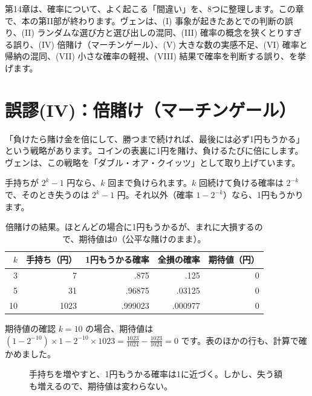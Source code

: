 \documentclass[a4paper,11pt,openany]{ltjsbook}
\begin{document}
第14章は、確率について、よく起こる「間違い」を、8つに整理します。この章で、本の第II部が終わります。ヴェンは、(I) 事象が起きたあとでの判断の誤り、(II) ランダムな選び方と選び出しの混同、(III) 確率の概念を狭くとりすぎる誤り、(IV) 倍賭け（マーチンゲール）、(V) 大きな数の実感不足、(VI) 確率と帰納の混同、(VII) 小さな確率の軽視、(VIII) 結果で確率を判断する誤り、を挙げます。

\section{誤謬(IV)：倍賭け（マーチンゲール）}

「負けたら賭け金を倍にして、勝つまで続ければ、最後には必ず1円もうかる」という戦略があります。コインの表裏に1円を賭け、負けるたびに倍にします。ヴェンは、この戦略を「ダブル・オア・クイッツ」として取り上げています。

手持ちが $2^k-1$ 円なら、$k$ 回まで負けられます。$k$ 回続けて負ける確率は $2^{-k}$ で、そのとき失うのは $2^k-1$ 円。それ以外（確率 $1-2^{-k}$）なら、1円もうかります。

\begin{table}[htbp]
\centering
\begin{tabular}{r|rrrr}
\toprule
$k$ & 手持ち（円） & 1円もうかる確率 & 全損の確率 & 期待値（円）\\
\midrule
3 & 7 & .875 & .125 & 0\\
5 & 31 & .96875 & .03125 & 0\\
10 & 1023 & .999023 & .000977 & 0\\
\bottomrule
\end{tabular}
\caption{倍賭けの結果。ほとんどの場合に1円もうかるが、まれに大損するので、期待値は0（公平な賭けのまま）。}
\end{table}

\begin{examplebox}{期待値の確認}
$k=10$ の場合、期待値は $(1-2^{-10})\times1-2^{-10}\times1023=\tfrac{1023}{1024}-\tfrac{1023}{1024}=0$ です。表のほかの行も、計算で確かめました。
\end{examplebox}

\begin{figure}[htbp]
\centering
{}
\caption{手持ちを増やすと、1円もうかる確率は1に近づく。しかし、失う額も増えるので、期待値は変わらない。}
\end{figure}
\end{document}
